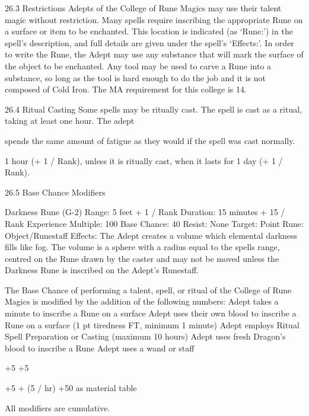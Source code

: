 \documentclass[a4paper]{article}
\begin{document}
\begin{multicols}{3}
26.3 Restrictions
Adepts of the College of Rune Magics may use
their talent magic without restriction. Many spells
require inscribing the appropriate Rune on a surface or item to be enchanted. This location is indicated (as ‘Rune:’) in the spell’s description, and
full details are given under the spell’s ‘Effects:’.
In order to write the Rune, the Adept may use any
substance that will mark the surface of the object to
be enchanted. Any tool may be used to carve a
Rune into a substance, so long as the tool is hard
enough to do the job and it is not composed of
Cold Iron.
The MA requirement for this college is 14.

26.4 Ritual Casting
Some spells may be ritually cast. The spell is cast
as a ritual, taking at least one hour. The adept

spends the same amount of fatigue as they would if
the spell was cast normally.

1 hour (+ 1 / Rank), unless it is ritually cast, when
it lasts for 1 day (+ 1 / Rank).

26.5 Base Chance Modifiers

Darkness Rune (G-2)
Range: 5 feet + 1 / Rank
Duration: 15 minutes + 15 / Rank
Experience Multiple: 100
Base Chance: 40%
Resist: None
Target: Point
Rune: Object/Runestaff
Effects: The Adept creates a volume which elemental darkness fills like fog. The volume is a
sphere with a radius equal to the spells range,
centred on the Rune drawn by the caster and may
not be moved unless the Darkness Rune is inscribed on the Adept’s Runestaff.

The Base Chance of performing a talent, spell, or
ritual of the College of Rune Magics is modified
by the addition of the following numbers:
Adept takes a minute to inscribe a
Rune on a surface
Adept uses their own blood to inscribe
a Rune on a surface (1 pt tiredness FT,
minimum 1 minute)
Adept employs Ritual Spell Preparation or Casting (maximum 10 hours)
Adept uses fresh Dragon’s blood to
inscribe a Rune
Adept uses a wand or staff

+5
+5

+5 + (5 /
hr)
+50
as material table

All modifiers are cumulative.


\end{multicols}
\end{document}
